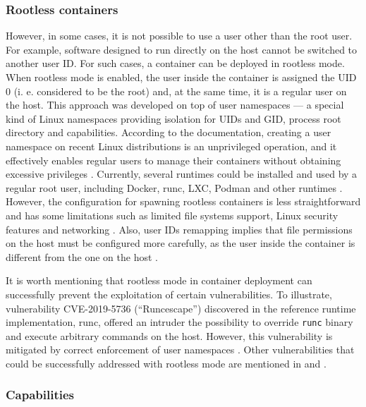 \subsubsection*{Rootless containers}

However, in some cases, it is not possible to use a user other than the root user. For example, software designed to run directly on the host cannot be switched to another user ID. For such cases, a container can be deployed in rootless mode. When rootless mode is enabled, the user inside the container is assigned the UID 0 (i. e. considered to be the root) and, at the same time, it is a regular user on the host. This approach was developed on top of user namespaces — a special kind of Linux namespaces providing isolation for UIDs and GID, process root directory and capabilities. According to the documentation, creating a user namespace on recent Linux distributions is an unprivileged operation, and it effectively enables regular users to manage their containers without obtaining excessive privileges \cite{m:usernamespaces}. Currently, several runtimes could be installed and used by a regular root user, including Docker, runc, LXC, Podman and other runtimes \cite{d:dockerrootless,gh:runc,s:lxc}. However, the configuration for spawning rootless containers is less straightforward and has some limitations such as limited file systems support, Linux security features and networking \cite{d:dockerrootless}. Also, user IDs remapping implies that file permissions on the host must be configured more carefully, as the user inside the container is different from the one on the host \cite{book:rice}.

It is worth mentioning that rootless mode in container deployment can successfully prevent the exploitation of certain vulnerabilities. To illustrate, vulnerability \linebreak CVE-2019-5736 (``Runcescape'') discovered in the reference runtime implementation, runc, offered an intruder the possibility to override \texttt{runc} binary and execute arbitrary commands on the host. However, this vulnerability is mitigated by correct enforcement of user namespaces \cite{s:CVE-2019-5736}. Other vulnerabilities that could be successfully addressed with rootless mode are mentioned in \cite{c:12} and \cite{d:enhancements}.

\subsubsection*{Capabilities}

